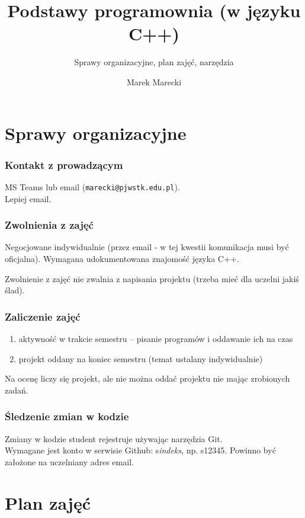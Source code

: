 \documentclass[aspectratio=169]{beamer}
\title{Podstawy programownia (w języku C++)}
\subtitle{Sprawy organizacyjne, plan zajęć, narzędzia}
\author{Marek Marecki}
\institute{Polsko-Japońska Akademia Technik Komputerowych}
\begin{document}
{%
    \frame{\titlepage}
}

\section{Sprawy organizacyjne}

\begin{frame}
    \frametitle{Kontakt z prowadzącym}

    MS Teams lub email ({\tt marecki@pjwstk.edu.pl}).\\
    Lepiej email.
\end{frame}

\begin{frame}
    \frametitle{Zwolnienia z zajęć}

    Negocjowane indywidualnie (przez email - w tej kwestii komunikacja musi być
    oficjalna).
    Wymagana udokumentowana znajomość języka C++.

    \vspace{1em}

    Zwolnienie z zajęć nie zwalnia z napisania projektu (trzeba mieć dla uczelni
    jakiś ślad).
\end{frame}

\begin{frame}
    \frametitle{Zaliczenie zajęć}

    \begin{enumerate}
        \item aktywność w trakcie semestru -- pisanie programów i oddawanie ich
            na czas
        \item projekt oddany na koniec semestru (temat ustalany indywidualnie)
    \end{enumerate}

    \vspace{1em}

    Na ocenę liczy się projekt, ale nie można oddać projektu nie mając
    zrobionych zadań.
\end{frame}

\begin{frame}
    \frametitle{Śledzenie zmian w kodzie}

    Zmiany w kodzie student rejestruje używając narzędzia Git.\\
    Wymagane jest konto w serwisie Github: s\emph{indeks}, np. s12345. Powinno
    być założone na uczelniany adres email.
\end{frame}

\section{Plan zajęć}
\end{document}
